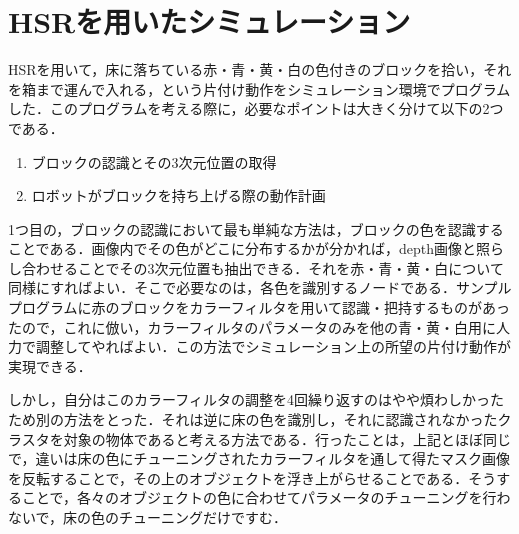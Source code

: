 \documentclass[onecolumn]{preport}
\begin{document}
\section{HSRを用いたシミュレーション}
HSRを用いて，床に落ちている赤・青・黄・白の色付きのブロックを拾い，それを箱まで運んで入れる，という片付け動作をシミュレーション環境でプログラムした．このプログラムを考える際に，必要なポイントは大きく分けて以下の2つである．
\begin{enumerate}
  \item ブロックの認識とその3次元位置の取得
  \item ロボットがブロックを持ち上げる際の動作計画
\end{enumerate}
\par1つ目の，ブロックの認識において最も単純な方法は，ブロックの色を認識することである．画像内でその色がどこに分布するかが分かれば，depth画像と照らし合わせることでその3次元位置も抽出できる．それを赤・青・黄・白について同様にすればよい．そこで必要なのは，各色を識別するノードである．サンプルプログラムに赤のブロックをカラーフィルタを用いて認識・把持するものがあったので，これに倣い，カラーフィルタのパラメータのみを他の青・黄・白用に人力で調整してやればよい．この方法でシミュレーション上の所望の片付け動作が実現できる．\par
しかし，自分はこのカラーフィルタの調整を4回繰り返すのはやや煩わしかったため別の方法をとった．それは逆に床の色を識別し，それに認識されなかったクラスタを対象の物体であると考える方法である．行ったことは，上記とほぼ同じで，違いは床の色にチューニングされたカラーフィルタを通して得たマスク画像を反転することで，その上のオブジェクトを浮き上がらせることである．そうすることで，各々のオブジェクトの色に合わせてパラメータのチューニングを行わないで，床の色のチューニングだけですむ．\par

\section{}




\end{document}
